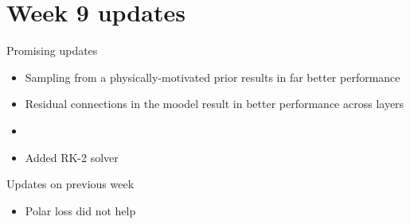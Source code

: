 \documentclass[handout, aspectratio=169,xcolor=dvipsnames]{beamer}
\begin{document}
\section{Week 9 updates}

\begin{frame}{Promising updates}
    \begin{itemize}
        \item Sampling from a physically-motivated prior results in far better performance
        \item Residual connections in the moodel result in better performance across layers
        \item 
    \end{itemize}
\end{frame}
\begin{frame}
    \begin{itemize}
        \item Added RK-2 solver
    \end{itemize}
\end{frame}
\begin{frame}{Updates on previous week}
    \begin{itemize}
        \item Polar loss did not help
    \end{itemize}
\end{frame}
\end{document}
